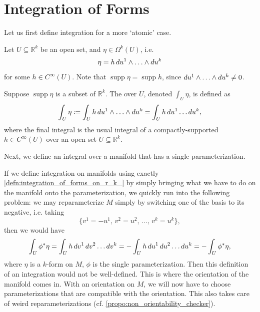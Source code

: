 \documentclass[notoc,notitlepage]{tufte-book}
\DeclareMathOperator{\supp}{supp}
\begin{document}

\section{Integration of Forms}%
\label{sec:integration_of_forms}

Let us first define integration for a more `atomic' case.

\begin{defn}\label{defn:integration_of_forms_on_r_k_} 
  Let $U \subseteq \mathbb{R}^k$ be an open set, and $\eta \in \Omega^k(U)$,
  i.e.
  \begin{equation*}
    \eta = h \mathop{}\!d{u^1} \land \hdots \land \mathop{}\!d{u^k}
  \end{equation*}
  for some $h \in C^\infty(U)$. Note that $\supp \eta = \supp h$, since
  $\mathop{}\!d{u^1} \land \hdots \land \mathop{}\!d{u^k} \neq 0$. 

  Suppose $\supp \eta$ is a  subset of $\mathbb{R}^k$. The
   over $U$, denoted $\int_{U} \eta$, is defined as
  \begin{equation*}
    \int_{U} \eta \coloneqq \int_{U} h \mathop{}\!d{u^1} \land \hdots \land \mathop{}\!d{u^k} =
    \int_{U} h \mathop{}\!d{u^1} \hdots \mathop{}\!d{u^k},
  \end{equation*}
  where the final integral is the usual integral of a compactly-supported $h \in
  C^\infty(U)$ over an open set $U \subseteq \mathbb{R}^k$.
\end{defn}

Next, we define an integral over a manifold that has a single parameterization.

\begin{note}\label{note:well_definedness_of_integrability_on_manifold}
  If we define integration on manifolds using exactly
  \cref{defn:integration_of_forms_on_r_k_} by simply bringing what we have to do
  on the manifold onto the parameterization, we quickly run into the following
  problem: we may reparameterize $M$ simply by switching one of the basis to its
  negative, i.e. taking
  \begin{equation*}
    \{ v^1 = - u^1, \, v^2 = u^2, \, \ldots, \, v^k = u^k \},
  \end{equation*}
  then we would have
  \begin{equation*}
    \int_{U} \phi^* \eta = \int_{U} h \mathop{}\!d{v^1} \mathop{}\!d{v^2} \hdots \mathop{}\!d{v^k} =
    - \int_{U} h \mathop{}\!d{u^1} \mathop{}\!d{u^2} \hdots \mathop{}\!d{u^k} = - \int_{U} \phi^* \eta,
  \end{equation*}
  where $\eta$ is a $k$-form on $M$, $\phi$ is the single parameterization. Then
  this definition of an integration would not be well-defined. This is where the
  orientation of the manifold comes in. With an orientation on $M$, we will now
  have to choose parameterizations that are compatible with the orientation.
  This also takes care of weird reparameterizations (cf.
  \cref{propo:non_orientability_checker}).
\end{note}
\end{document}

